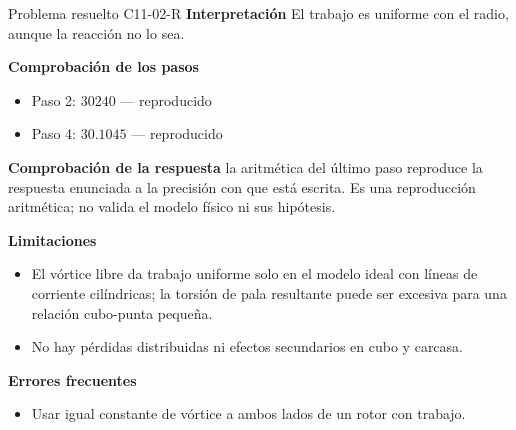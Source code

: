 \documentclass[10pt,openany]{book}
\begin{document}
\begin{studiumworked}{Problema resuelto C11-02-R}
\noindent\textbf{Interpretación}
El trabajo es uniforme con el radio, aunque la reacción no lo sea.

\noindent\textbf{Comprobación de los pasos}
\begin{itemize}
\item Paso 2: $30240$ — reproducido
\item Paso 4: $30.1045$ — reproducido
\end{itemize}

\noindent\textbf{Comprobación de la respuesta} la aritmética del último paso reproduce la respuesta enunciada a la precisión con que está escrita. Es una reproducción aritmética; no valida el modelo físico ni sus hipótesis.

\noindent\textbf{Limitaciones}
\begin{itemize}
\item El vórtice libre da trabajo uniforme solo en el modelo ideal con líneas de corriente cilíndricas; la torsión de pala resultante puede ser excesiva para una relación cubo-punta pequeña.
\item No hay pérdidas distribuidas ni efectos secundarios en cubo y carcasa.
\end{itemize}

\noindent\textbf{Errores frecuentes}
\begin{itemize}
\item Usar igual constante de vórtice a ambos lados de un rotor con trabajo.
\end{itemize}
\end{studiumworked}
\end{document}
